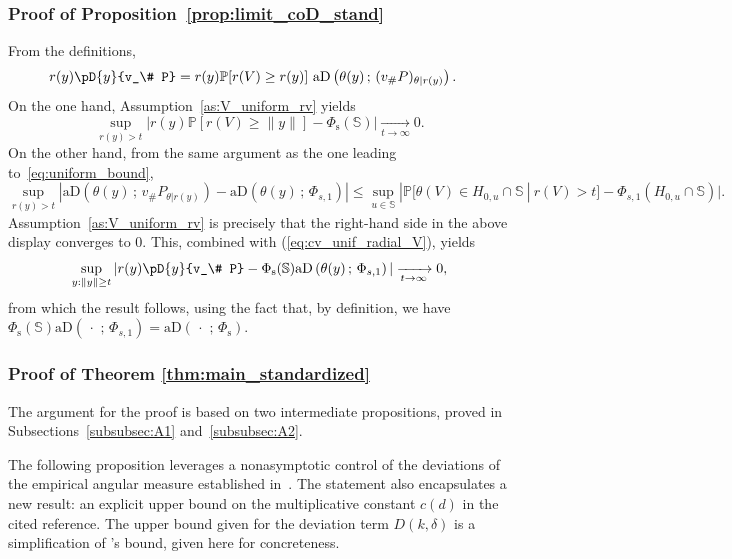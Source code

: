 \documentclass{article}
\numberwithin{equation}{section}
\renewcommand{\P}{\mathbb{P}}
\newcommand{\point}{\,\cdot\,}
\newcommand{\PP}{\P}%
\newcommand{\sphere}{\mathbb{S}}
\newcommand{\tto}{\xrightarrow[t\to\infty]{}}
\newcommand{\coD}[2]{\pD{#1}{#2}}
\newcommand{\aD}[2]{{\mathrm{aD}}\left({#1}\,;\,{#2}\right)}
\newcommand{\Phitrad}{\Phi_{\mathrm{s}}} %
\newcommand{\Phisprob}{\Phi_{s,1}} %
\begin{document}
\subsubsection{Proof of Proposition~\ref{prop:limit_coD_stand}}
  From the definitions,
  \begin{align*}
    r(y) \coD{y}{v_\# P} & = r(y) \PP[r(V) \ge  r(y )]~\aD{\theta(y)}{(v_\#P)_{\theta | r(y)}}. 
  \end{align*}
  On the one hand, Assumption~\ref{as:V_uniform_rv} yields
  \begin{equation}
    \label{eq:cv_unif_radial_V}
    \sup_{r(y)>t } \Big|  r(y) \PP[r(V) \ge  \|y \|]  - \Phitrad(\sphere) \Big|
    \xrightarrow[t\to\infty]{} 0. 
  \end{equation}
  On the other hand, from the
same argument as the one leading to~\eqref{eq:uniform_bound}, 
  $$
\sup_{r(y)>t}  |
\aD{\theta(y)}{v_\#P_{\theta|r(y)}} - \aD{\theta(y)}{\Phisprob} |
\le \sup_{u\in\sphere} | \PP[\theta(V)  \in H_{0,u}\cap \sphere~|~r(V)>t ] -
\Phisprob( H_{0,u}\cap \sphere) |.
$$
Assumption~\ref{as:V_uniform_rv} is precisely that the right-hand
side in the above display converges to $0$.
This, combined with (\ref{eq:cv_unif_radial_V}), yields
  $$
  \sup_{ y: \|y \| \ge t}   | r(y) \coD{y}{v_\# P} - \Phitrad(\sphere)
  \aD{\theta(y)}{\Phisprob}| \tto 0, 
  $$
  from which the result follows, using the fact that, by definition, we have 
$\Phitrad(\sphere)\aD{\point}{\Phisprob} = \aD{\point}{\Phitrad}. $

\subsubsection{Proof of Theorem \ref{thm:main_standardized}}

The argument for the proof is based on two intermediate propositions, proved in Subsections~\ref{subsubsec:A1} and~\ref{subsubsec:A2}.
\bigskip

The following proposition leverages a  nonasymptotic control of
the deviations of the empirical angular measure established 
in~\cite{ClemenconJalalzaiSabourinSegers2023}. The statement also
encapsulates a new result: an explicit upper bound on the multiplicative constant
$c(d)$ in the cited reference. 
The upper bound given for the deviation term $D(k,\delta)$ is a simplification of \cite{ClemenconJalalzaiSabourinSegers2023}'s bound, given here for concreteness. 
\end{document}
